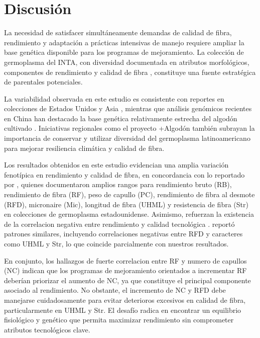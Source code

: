 \documentclass[12pt,oneside]{reedthesis}
\begin{document}
\section{Discusión}\label{discusiuxf3n}

La necesidad de satisfacer simultáneamente demandas de calidad de fibra, rendimiento y adaptación a prácticas intensivas de manejo requiere ampliar la base genética disponible para los programas de mejoramiento. La colección de germoplasma del INTA, con diversidad documentada en atributos morfológicos, componentes de rendimiento y calidad de fibra \autocite{royo2003,klein2011,spoljaric2018,scarpin2019,arriel2023}, constituye una fuente estratégica de parentales potenciales.

La variabilidad observada en este estudio es consistente con reportes en colecciones de Estados Unidos \autocite{hinze2025} y Asia \autocite{farooq2017}, mientras que análisis genómicos recientes en China han destacado la base genética relativamente estrecha del algodón cultivado \autocite{li2023}. Iniciativas regionales como el proyecto +Algodón \autocite{fao2025} también subrayan la importancia de conservar y utilizar diversidad del germoplasma latinoamericano para mejorar resiliencia climática y calidad de fibra.

Los resultados obtenidos en este estudio evidencian una amplia variación fenotípica en rendimiento y calidad de fibra, en concordancia con lo reportado por \autocite{mccarty2006}, quienes documentaron amplios rangos para rendimiento bruto (RB), rendimiento de fibra (RF), peso de capullo (PC), rendimiento de fibra al desmote (RFD), micronaire (Mic), longitud de fibra (UHML) y resistencia de fibra (Str) en colecciones de germoplasma estadounidense. Asimismo, refuerzan la existencia de la correlacion negativa entre rendimiento y calidad tecnológica \autocite{li2023}. \textcite{meredith1984} reportó patrones similares, incluyendo correlaciones negativas entre RFD y caracteres como UHML y Str, lo que coincide parcialmente con nuestros resultados.

En conjunto, los hallazgos de fuerte correlacion entre RF y numero de capullos (NC) indican que los programas de mejoramiento orientados a incrementar RF deberían priorizar el aumento de NC, ya que constituye el principal componente asociado al rendimiento. No obstante, el incremento de NC y RFD debe manejarse cuidadosamente para evitar deterioros excesivos en calidad de fibra, particularmente en UHML y Str. El desafío radica en encontrar un equilibrio fisiológico y genético que permita maximizar rendimiento sin comprometer atributos tecnológicos clave.
\end{document}
